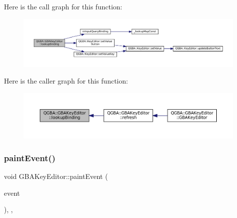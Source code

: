 Here is the call graph for this function\+:
\nopagebreak
\begin{figure}[H]
\begin{center}
\leavevmode
\includegraphics[width=350pt]{class_q_g_b_a_1_1_g_b_a_key_editor_a4f0fd55f1a17e0c7bde4a82d244602ce_cgraph}
\end{center}
\end{figure}
Here is the caller graph for this function\+:
\nopagebreak
\begin{figure}[H]
\begin{center}
\leavevmode
\includegraphics[width=350pt]{class_q_g_b_a_1_1_g_b_a_key_editor_a4f0fd55f1a17e0c7bde4a82d244602ce_icgraph}
\end{center}
\end{figure}
\mbox{\label{class_q_g_b_a_1_1_g_b_a_key_editor_a5c53525fde95136dc8a5ef3cebd1b9bf}} 
\subsubsection{\texorpdfstring{paint\+Event()}{paintEvent()}}
{\footnotesize\ttfamily void G\+B\+A\+Key\+Editor\+::paint\+Event (\begin{DoxyParamCaption}\item[{Q\+Paint\+Event $\ast$}]{event }\end{DoxyParamCaption})\hspace{0.3cm}{\ttfamily [override]}, {\ttfamily [protected]}, {\ttfamily [virtual]}}

\mbox{\label{class_q_g_b_a_1_1_g_b_a_key_editor_ab32fdd08ededd70914682b14b4f4c127}} 
